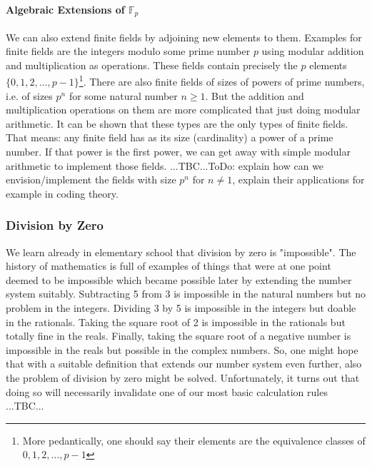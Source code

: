 \paragraph{Algebraic Extensions of $\mathbb{F}_p$} We can also extend finite fields by adjoining new elements to them. Examples for finite fields are the integers modulo some prime number $p$ using modular addition and multiplication as operations. These fields contain precisely the $p$ elements $\{0,1,2,\ldots,p-1\}$\footnote{More pedantically, one should say their elements are the equivalence classes of $0,1,2,\ldots,p-1$}. There are also finite fields of sizes of powers of prime numbers, i.e. of sizes $p^n$ for some natural number $n \geq 1$. But the addition and multiplication operations on them are more complicated that just doing modular arithmetic. It can be shown that these types are the only types of finite fields. That means: any finite field has as its size (cardinality) a power of a prime number. If that power is the first power, we can get away with simple modular arithmetic to implement those fields. ...TBC...ToDo: explain how can we envision/implement the fields with size $p^n$ for $n \neq 1$, explain their applications for example in coding theory.




\subsubsection{Division by Zero}
We learn already in elementary school that division by zero is "impossible". The history of mathematics is full of examples of things that were at one point deemed to be impossible which became possible later by extending the number system suitably. Subtracting 5 from 3 is impossible in the natural numbers but no problem in the integers. Dividing 3 by 5 is impossible in the integers but doable in the rationals. Taking the square root of 2 is impossible in the rationals but totally fine in the reals. Finally, taking the square root of a negative number is impossible in the reals but possible in the complex numbers. So, one might hope that with a suitable definition that extends our number system even further, also the problem of division by zero might be solved. Unfortunately, it turns out that doing so will necessarily invalidate one of our most basic calculation rules ...TBC...


